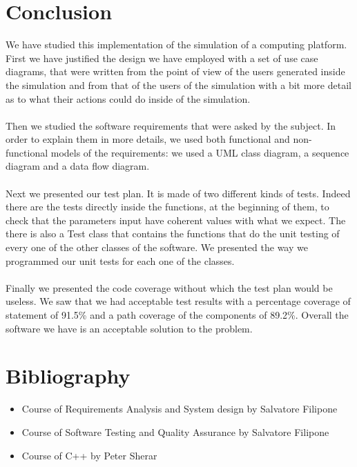\documentclass [10 pt, a4 paper]{report}
\begin{document}
\chapter{Conclusion}
We have studied this implementation of the simulation of a computing platform. First we have justified the design we have employed with a set of use case diagrams, that were written from the point of view of the users generated inside the simulation and from that of the users of the simulation with a bit more detail as to what their actions could do inside of the simulation.
\\ \\
Then we studied the software requirements that were asked by the subject. In order to explain them in more details, we used both functional and non-functional models of the requirements: we used a UML class diagram, a sequence diagram and a data flow diagram.
\\ \\
Next we presented our test plan. It is made of two different kinds of tests. Indeed there are the tests directly inside the functions, at the beginning of them, to check that the parameters input have coherent values with what we expect. The there is also a Test class that contains the functions that do the unit testing of every one of the other classes of the software. We presented the way we programmed our unit tests for each one of the classes.
\\ \\
Finally we presented the code coverage without which the test plan would be useless. We saw that we had acceptable test results with a percentage coverage of statement of 91.5\% and a path coverage of the components of 89.2\%. Overall the software we have is an acceptable solution to the problem.




\chapter{Bibliography}

\begin{itemize}
    \item Course of Requirements Analysis and System design by Salvatore Filipone
    \item Course of Software Testing and Quality Assurance by Salvatore Filipone
    \item Course of C++ by Peter Sherar
\end{itemize}
\end{document}
